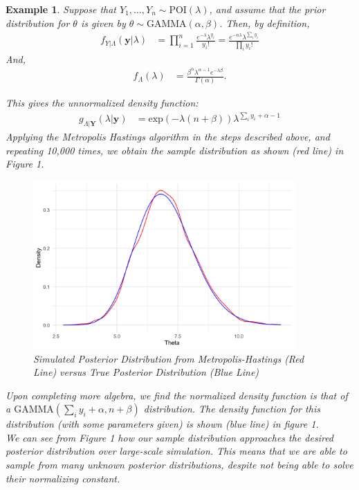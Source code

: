 \documentclass[10pt]{article}
\newtheorem{example}{Example}
\begin{document}
\begin{example}
    Suppose that $Y_{1}, \ldots, Y_{n} \sim \text{POI} \left( \lambda \right)$, and assume that the prior distribution for $\theta$ is given by $\theta \sim \text{GAMMA} \left( \alpha, \beta \right)$. Then, by definition, 
    \begin{align*}
        f_{Y | \Lambda} \left( \mathbf{y} |  \lambda \right) &= \prod_{i=1}^{n} \frac{e^{- \lambda} \lambda ^{y_{i}}}{y_{i}!} = \frac{e^{-n \lambda} \lambda^{\sum_{i} y_{i}}}{\prod_{i} y_{i}!}
    \end{align*}
    And,
    \begin{align*}
        f_{\Lambda} \left( \lambda \right) &= \frac{\beta ^{\alpha} \lambda^{\alpha - 1} e^{- \lambda \beta}}{ \Gamma \left( \alpha \right)}.
    \end{align*}
    \pagebreak

    \noindent
    This gives the unnormalized density function:
    \begin{align*}
        g_{\Lambda | \mathbf{Y}} \left(\lambda | \mathbf{y} \right) &= \text{exp} \left( - \lambda \left( n + \beta \right) \right) \lambda^{\sum_{i} y_{i} + \alpha - 1}
    \end{align*}
    Applying the Metropolis Hastings algorithm in the steps described above, and repeating 10,000 times, we obtain the sample distribution as shown (red line) in Figure 1.
    \begin{figure}
        \centering
        \includegraphics[width=100mm,scale=0.5]{Figure1.png}
        \caption{Simulated Posterior Distribution from Metropolis-Hastings (Red Line) versus True Posterior Distribution (Blue Line)}
        \label{fig:my_label}
    \end{figure}
    Upon completing more algebra, we find the normalized density function is that of a $\text{GAMMA} \left( \sum_{i} y_{i} + \alpha, n + \beta \right)$ distribution. The density function for this distribution (with some parameters given) is shown (blue line) in figure 1.
    \\[1\baselineskip]
    We can see from Figure 1 how our sample distribution approaches the desired posterior distribution over large-scale simulation. This means that we are able to sample from many unknown posterior distributions, despite not being able to solve their normalizing constant.
\end{example}
\end{document}
